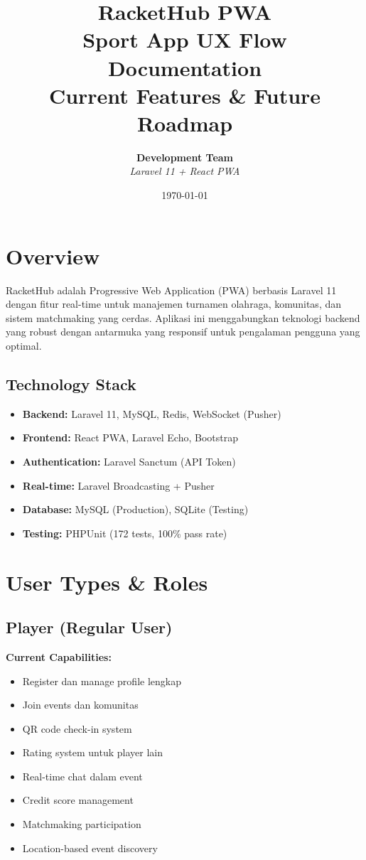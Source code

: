 \documentclass[12pt,a4paper]{article}
\title{\Huge\textbf{RacketHub PWA}\\
\Large Sport App UX Flow Documentation\\
\large Current Features \& Future Roadmap}
\author{
    \textbf{Development Team}\\
    \textit{Laravel 11 + React PWA}
}
\date{\today}
\begin{document}
\maketitle
\newpage

\tableofcontents
\newpage

\section{Overview}

\begin{infobox}
RacketHub adalah Progressive Web Application (PWA) berbasis Laravel 11 dengan fitur real-time untuk manajemen turnamen olahraga, komunitas, dan sistem matchmaking yang cerdas. Aplikasi ini menggabungkan teknologi backend yang robust dengan antarmuka yang responsif untuk pengalaman pengguna yang optimal.
\end{infobox}

\subsection{Technology Stack}

\begin{itemize}
    \item \textbf{Backend:} Laravel 11, MySQL, Redis, WebSocket (Pusher)
    \item \textbf{Frontend:} React PWA, Laravel Echo, Bootstrap
    \item \textbf{Authentication:} Laravel Sanctum (API Token)
    \item \textbf{Real-time:} Laravel Broadcasting + Pusher
    \item \textbf{Database:} MySQL (Production), SQLite (Testing)
    \item \textbf{Testing:} PHPUnit (172 tests, 100\% pass rate)
\end{itemize}

\section{User Types \& Roles}

\subsection{Player (Regular User)}
\begin{implemented}
\textbf{Current Capabilities:}
\begin{itemize}
    \item Register dan manage profile lengkap
    \item Join events dan komunitas
    \item QR code check-in system
    \item Rating system untuk player lain
    \item Real-time chat dalam event
    \item Credit score management
    \item Matchmaking participation
    \item Location-based event discovery
\end{itemize}
\end{implemented}
\end{document}
